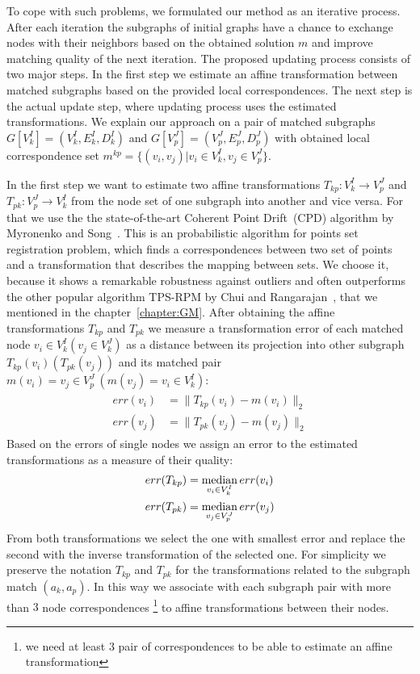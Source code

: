 To cope with such problems, we formulated our method as an iterative process. After each iteration the subgraphs of initial graphs have a chance to exchange nodes with their neighbors based on the obtained solution $m$ and improve matching quality of the next iteration. The proposed updating process consists of two major steps. In the first step we estimate an affine transformation between matched subgraphs based on the provided local correspondences. The next step is the actual update step, where updating process uses the estimated transformations.
We explain our approach on a pair of matched subgraphs $G[V^I_k]=(V^I_k, E^I_k, D^I_k)$ and $G[V^J_p]=(V^J_p, E^J_p, D^J_p)$  with obtained local correspondence set $m^{kp}=\{(v_i,v_j)|v_i\in V^I_k, v_j\in V^J_p\}$. 

In the first step we want to estimate two affine transformations $T_{kp}:V^I_k\rightarrow V^J_p$ and $T_{pk}:V^J_p\rightarrow V^I_k$ from the node set of one subgraph into another and vice versa. For that we use the  the state-of-the-art Coherent Point Drift~(CPD) algorithm by Myronenko and Song~\cite{Myronenko2009_CPD}. This is an probabilistic algorithm for points set registration problem, which finds a correspondences between two set of points and a transformation that describes the mapping between sets. We choose it, because it shows a remarkable robustness against outliers and often outperforms the other popular algorithm TPS-RPM by Chui and Rangarajan~\cite{Chui2003}, that we mentioned in the chapter~\ref{chapter:GM}. After obtaining the affine transformations $T_{kp}$ and $T_{pk}$ we measure a transformation error of each matched node $v_i\in V^I_k (v_j\in V^J_k)$ as a distance between its projection into other subgraph $T_{kp}(v_i) (T_{pk}(v_j))$ and its matched pair $m(v_i) = v_j\in V^J_p\ (m(v_j) = v_i\in V^I_k)$:
\begin{align}\begin{split} \label{eq:err_v}
err(v_i) &= \|T_{kp}(v_i) - m(v_i)\|_{2}\\
err(v_j) &= \|T_{pk}(v_j) - m(v_j)\|_{2}
\end{split}\end{align}
Based on the errors of single nodes we assign an error to the estimated transformations as a measure of their quality:
\begin{equation}\begin{split} \label{eq:err_T}
err(T_{kp}) & = \mathop{\rm median}_{v_i\in V^I_k}err(v_i) \\
err(T_{pk}) & = \mathop{\rm median}_{v_j\in V^J_p}err(v_j)
\end{split}\end{equation}
From both transformations we select the one with smallest error and replace the second with the inverse transformation of the selected one. For simplicity we preserve the notation $T_{kp}$ and $T_{pk}$ for the transformations related to the subgraph match $(a_k, a_p)$. In this way we associate with each subgraph pair with more than $3$ node correspondences \footnote{we need at least $3$ pair of correspondences to be able to estimate an affine transformation} to affine transformations between their nodes.

